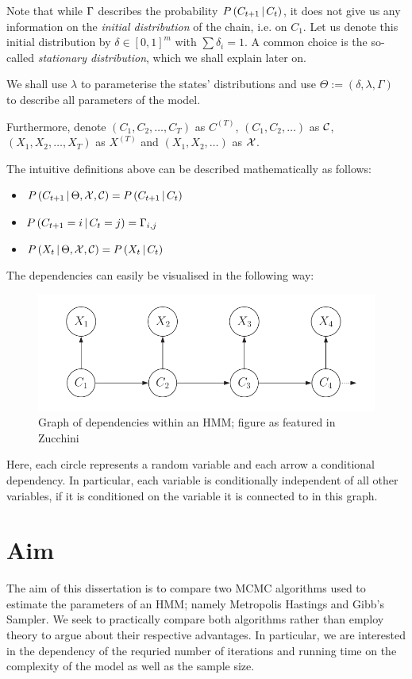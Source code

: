 Note that while $\Gamma$ describes the probability $P\left(C_{t+1} \, | \, C_t\right)$, it does not give us any information on the \textit{initial distribution} of the chain, i.e. on $C_1$. Let us denote this initial distribution by  $\delta \in [0,1]^m$ with $\sum \delta_i = 1$. A common choice is the so-called \textit{stationary distribution}, which we shall explain later on. 

We shall use $\lambda$ to parameterise the states' distributions and use $\Theta := \left(\delta, \lambda, \Gamma \right)$ to describe all parameters of the model.

Furthermore, denote $\left(C_1, C_2, \dots, C_T \right)$ as $C^{(T)}$, $\left(C_1, C_2, \dots \right)$ as $\mathcal{C}$, $\left(X_1, X_2, \dots, X_T \right)$ as $X^{(T)}$ and $\left(X_1, X_2, \dots \right)$ as $\mathcal{X}$. 

The intuitive definitions above can be described mathematically as follows:
\begin{itemize}	
	\item $P\left(C_{t+1} \, | \, \Theta, \mathcal{X}, \mathcal{C}\right) = P\left(C_{t+1} \, | \, C_t\right)$
	
	\item $P\left(C_{t+1} = i \, | \, C_t = j\right) = \Gamma_{i, j} $ 
	
	\item $P\left(X_t \, | \,  \Theta, \mathcal{X}, \mathcal{C}\right) = P\left(X_t \, | \, C_t\right)$
\end{itemize}


The dependencies can easily be visualised in the following way:
\begin{figure}[H]
\includegraphics[width=0.8\linewidth]{img/hmm_dependencies.png}
\caption{Graph of dependencies within an HMM; figure as featured in Zucchini}
\end{figure}
Here, each circle represents a random variable and each arrow a conditional dependency. In particular, each variable is conditionally independent of all other variables, if it is conditioned on the variable it is connected to in this graph. 


\section{Aim}
The aim of this dissertation is to compare two MCMC algorithms used to estimate the parameters of an HMM; namely Metropolis Hastings and Gibb's Sampler. We seek to practically compare both algorithms rather than employ theory to argue about their respective advantages. In particular, we are interested in the dependency of the requried number of iterations and running time on the complexity of the model as well as the sample size. 

